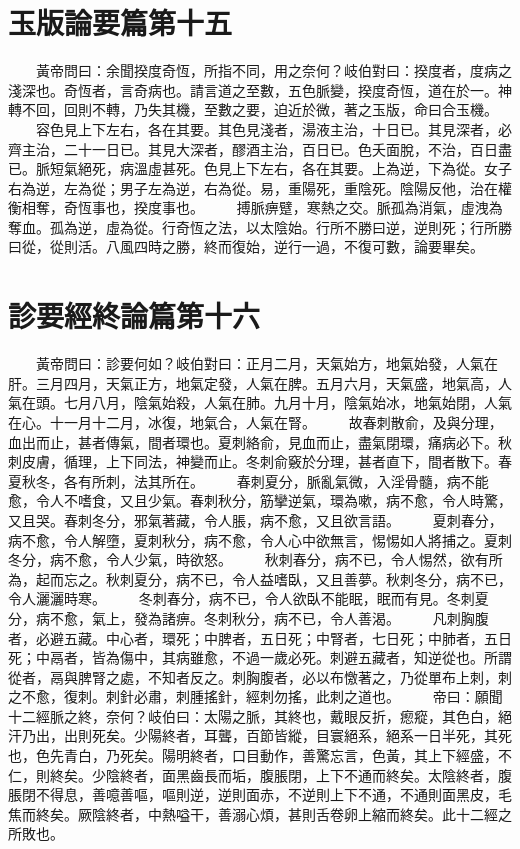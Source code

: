 \section{玉版論要篇第十五}

　　黃帝問曰：余聞揆度奇恆，所指不同，用之奈何？岐伯對曰：揆度者，度病之淺深也。奇恆者，言奇病也。請言道之至數，五色脈變，揆度奇恆，道在於一。神轉不回，回則不轉，乃失其機，至數之要，迫近於微，著之玉版，命曰合玉機。
　　容色見上下左右，各在其要。其色見淺者，湯液主治，十日已。其見深者，必齊主治，二十一日已。其見大深者，醪酒主治，百日已。色夭面脫，不治，百日盡已。脈短氣絕死，病溫虛甚死。色見上下左右，各在其要。上為逆，下為從。女子右為逆，左為從；男子左為逆，右為從。易，重陽死，重陰死。陰陽反他，治在權衡相奪，奇恆事也，揆度事也。
　　搏脈痹躄，寒熱之交。脈孤為消氣，虛洩為奪血。孤為逆，虛為從。行奇恆之法，以太陰始。行所不勝曰逆，逆則死；行所勝曰從，從則活。八風四時之勝，終而復始，逆行一過，不復可數，論要畢矣。


\section{診要經終論篇第十六}

　　黃帝問曰：診要何如？岐伯對曰：正月二月，天氣始方，地氣始發，人氣在肝。三月四月，天氣正方，地氣定發，人氣在脾。五月六月，天氣盛，地氣高，人氣在頭。七月八月，陰氣始殺，人氣在肺。九月十月，陰氣始冰，地氣始閉，人氣在心。十一月十二月，冰復，地氣合，人氣在腎。
　　故春刺散俞，及與分理，血出而止，甚者傳氣，間者環也。夏刺絡俞，見血而止，盡氣閉環，痛病必下。秋刺皮膚，循理，上下同法，神變而止。冬刺俞竅於分理，甚者直下，間者散下。春夏秋冬，各有所刺，法其所在。
　　春刺夏分，脈亂氣微，入淫骨髓，病不能愈，令人不嗜食，又且少氣。春刺秋分，筋攣逆氣，環為嗽，病不愈，令人時驚，又且哭。春刺冬分，邪氣著藏，令人脹，病不愈，又且欲言語。
　　夏刺春分，病不愈，令人解墮，夏刺秋分，病不愈，令人心中欲無言，惕惕如人將捕之。夏刺冬分，病不愈，令人少氣，時欲怒。
　　秋刺春分，病不已，令人惕然，欲有所為，起而忘之。秋刺夏分，病不已，令人益嗜臥，又且善夢。秋刺冬分，病不已，令人灑灑時寒。
　　冬刺春分，病不已，令人欲臥不能眠，眠而有見。冬刺夏分，病不愈，氣上，發為諸痹。冬刺秋分，病不已，令人善渴。
　　凡刺胸腹者，必避五藏。中心者，環死；中脾者，五日死；中腎者，七日死；中肺者，五日死；中鬲者，皆為傷中，其病雖愈，不過一歲必死。刺避五藏者，知逆從也。所謂從者，鬲與脾腎之處，不知者反之。刺胸腹者，必以布憿著之，乃從單布上刺，刺之不愈，復刺。刺針必肅，刺腫搖針，經刺勿搖，此刺之道也。
　　帝曰：願聞十二經脈之終，奈何？岐伯曰：太陽之脈，其終也，戴眼反折，瘛瘲，其色白，絕汗乃出，出則死矣。少陽終者，耳聾，百節皆縱，目寰絕系，絕系一日半死，其死也，色先青白，乃死矣。陽明終者，口目動作，善驚忘言，色黃，其上下經盛，不仁，則終矣。少陰終者，面黑齒長而垢，腹脹閉，上下不通而終矣。太陰終者，腹脹閉不得息，善噫善嘔，嘔則逆，逆則面赤，不逆則上下不通，不通則面黑皮，毛焦而終矣。厥陰終者，中熱嗌干，善溺心煩，甚則舌卷卵上縮而終矣。此十二經之所敗也。


